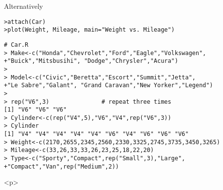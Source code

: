 Alternatively
\begin{verbatim}
>attach(Car)
>plot(Weight, Mileage, main="Weight vs. Mileage")
\end{verbatim}






\begin{verbatim}
# Car.R
> Make<-c("Honda","Chevrolet","Ford","Eagle","Volkswagen",
+"Buick","Mitsbusihi", "Dodge","Chrysler","Acura")
>
> Model<-c("Civic","Beretta","Escort","Summit","Jetta",
+"Le Sabre","Galant", "Grand Caravan","New Yorker","Legend")
>
> rep("V6",3)               # repeat three times
[1] "V6" "V6" "V6"
> Cylinder<-c(rep("V4",5),"V6","V4",rep("V6",3))
> Cylinder
[1] "V4" "V4" "V4" "V4" "V4" "V6" "V4" "V6" "V6" "V6"
> Weight<-c(2170,2655,2345,2560,2330,3325,2745,3735,3450,3265)
> Mileage<-c(33,26,33,33,26,23,25,18,22,20)
> Type<-c("Sporty","Compact",rep("Small",3),"Large",
+"Compact","Van",rep("Medium",2))
\end{verbatim}

<p>
